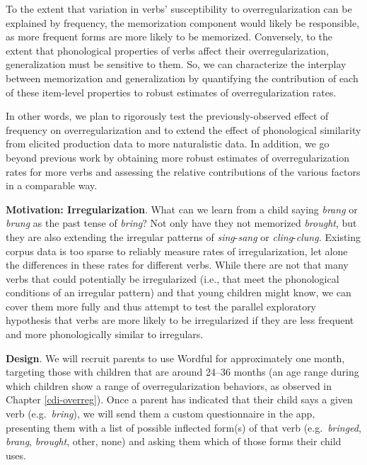\documentclass[
   11pt,
       ]{book}
\begin{document}
To the extent that variation in verbs' susceptibility to overregularization can be explained by frequency, the memorization component would likely be responsible, as more frequent forms are more likely to be memorized. Conversely, to the extent that phonological properties of verbs affect their overregularization, generalization must be sensitive to them. So, we can characterize the interplay between memorization and generalization by quantifying the contribution of each of these item-level properties to robust estimates of overregularization rates.

In other words, we plan to rigorously test the previously-observed effect of frequency on overregularization and to extend the effect of phonological similarity from elicited production data to more naturalistic data. In addition, we go beyond previous work by obtaining more robust estimates of overregularization rates for more verbs and assessing the relative contributions of the various factors in a comparable way.

\textbf{Motivation: Irregularization}. What can we learn from a child saying \emph{brang} or \emph{brung} as the past tense of \emph{bring}? Not only have they not memorized \emph{brought}, but they are also extending the irregular patterns of \emph{sing}-\emph{sang} or \emph{cling}-\emph{clung.} Existing corpus data is too sparse to reliably measure rates of irregularization, let alone the differences in these rates for different verbs. While there are not that many verbs that could potentially be irregularized (i.e., that meet the phonological conditions of an irregular pattern) and that young children might know, we can cover them more fully and thus attempt to test the parallel exploratory hypothesis that verbs are more likely to be irregularized if they are less frequent and more phonologically similar to irregulars.

\textbf{Design}. We will recruit parents to use Wordful for approximately one month, targeting those with children that are around 24--36 months (an age range during which children show a range of overregularization behaviors, as observed in Chapter \ref{cdi-overreg}). Once a parent has indicated that their child says a given verb (e.g.~\emph{bring}), we will send them a custom questionnaire in the app, presenting them with a list of possible inflected form(s) of that verb (e.g.~\emph{bringed}, \emph{brang}, \emph{brought}, other, none) and asking them which of those forms their child uses.
\end{document}
